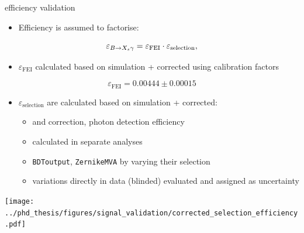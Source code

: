 \documentclass[xcolor=dvipsnames]{beamer}
\begin{document}
\begin{frame}{\BtoXsgamma efficiency validation}
\scriptsize\centering
\begin{itemize}
   \item Efficiency is assumed to factorise:
\end{itemize}
\begin{equation*}
   \varepsilon_{\BtoXsgamma} = \varepsilon_{\mathrm{FEI}} \cdot \varepsilon_{\mathrm{selection}},
\end{equation*}



\begin{itemize}
   \item $\varepsilon_{\mathrm{FEI}}$ calculated based on simulation + corrected using calibration factors
\end{itemize}
\begin{equation*}
   \varepsilon_{\mathrm{FEI}} = 0.00444\pm0.00015
\end{equation*}
\begin{itemize}
   \item $\varepsilon_{\mathrm{selection}}$ are calculated based on simulation + corrected:
   \begin{itemize}
      \scriptsize
      \item \piVeto and \etaVeto correction, photon detection efficiency 
      \item[\ra] calculated in separate analyses
      \item \texttt{BDToutput}, \texttt{ZernikeMVA} by varying their selection 
      \item[\ra] variations directly in data (blinded) evaluated and assigned as uncertainty
   \end{itemize}
\end{itemize}
\texttt{[image: ../phd\_thesis/figures/signal\_validation/corrected\_selection\_efficiency.pdf]}



\end{frame}
\end{document}
